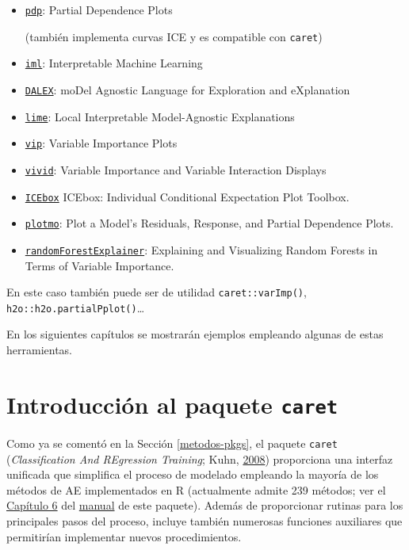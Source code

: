 \documentclass[
  spanish,
]{book}
\theoremstyle{break}
\theoremstyle{definition}
\theoremstyle{definition}
\theoremstyle{definition}
\theoremstyle{remark}
\begin{document}
\begin{itemize}
\item
  \href{https://bgreenwell.github.io/pdp/index.html}{\texttt{pdp}}: Partial Dependence Plots

  (también implementa curvas ICE y es compatible con \texttt{caret})
\item
  \href{https://christophm.github.io/iml}{\texttt{iml}}: Interpretable Machine Learning
\item
  \href{https://modeloriented.github.io/DALEX}{\texttt{DALEX}}: moDel Agnostic Language for Exploration and eXplanation
\item
  \href{https://lime.data-imaginist.com}{\texttt{lime}}: Local Interpretable Model-Agnostic Explanations
\item
  \href{https://koalaverse.github.io/vip/index.html}{\texttt{vip}}: Variable Importance Plots
\item
  \href{https://github.com/AlanInglis/vivid}{\texttt{vivid}}: Variable Importance and Variable Interaction Displays
\item
  \href{https://CRAN.R-project.org/package=ICEbox}{\texttt{ICEbox}} ICEbox: Individual Conditional Expectation Plot Toolbox. 
\item
  \href{http://www.milbo.users.sonic.net/}{\texttt{plotmo}}: Plot a Model's Residuals, Response, and Partial Dependence Plots.
\item
  \href{https://modeloriented.github.io/randomForestExplainer}{\texttt{randomForestExplainer}}: Explaining and Visualizing Random Forests in Terms of Variable Importance. 
\end{itemize}

En este caso también puede ser de utilidad \texttt{caret::varImp()}, \texttt{h2o::h2o.partialPplot()}\ldots{}

En los siguientes capítulos se mostrarán ejemplos empleando algunas de estas herramientas.

\hypertarget{caret}{%
\section{\texorpdfstring{Introducción al paquete \texttt{caret}}{Introducción al paquete caret}}\label{caret}}

Como ya se comentó en la Sección \ref{metodos-pkgs}, el paquete \texttt{caret} (\emph{Classification And REgression Training}; Kuhn, \protect\hyperlink{ref-kuhn2008building}{2008}) proporciona una interfaz unificada que simplifica el proceso de modelado empleando la mayoría de los métodos de AE implementados en R (actualmente admite 239 métodos; ver el \href{https://topepo.github.io/caret/available-models.html}{Capítulo 6} del \href{https://topepo.github.io/caret}{manual} de este paquete).
Además de proporcionar rutinas para los principales pasos del proceso, incluye también numerosas funciones auxiliares que permitirían implementar nuevos procedimientos.
\end{document}
